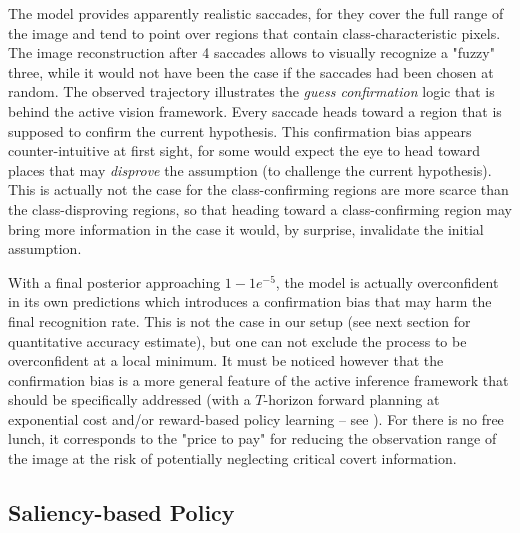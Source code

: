 \documentclass{article} %
\begin{document}
The model provides apparently realistic saccades, for they cover the full range of the image and tend to point over regions that contain class-characteristic pixels. The image reconstruction after 4 saccades allows to visually recognize a "fuzzy" three, while it would not have been the case if the saccades had been chosen at random.
The observed trajectory illustrates the \emph{guess confirmation} logic that is behind the active vision framework. Every saccade heads toward a region that is supposed to confirm the current hypothesis. This confirmation bias appears counter-intuitive at first sight, for some would expect the eye to head toward places that may \emph{disprove} the assumption (to challenge the current hypothesis). This is actually not the case for the class-confirming regions are more scarce than the class-disproving regions, so that heading toward a class-confirming region may bring more information in the case it would, by surprise, invalidate the initial assumption.

With a final posterior approaching $1 - 1e^{-5}$, the model is actually overconfident in its own predictions which introduces a confirmation bias that may harm the final recognition rate. This is not the case in our setup (see next section for quantitative accuracy estimate), but one can not exclude the process to be overconfident at a local minimum. It must be noticed however that the confirmation bias is a more general feature of the active inference framework that should be specifically addressed (with a $T$-horizon forward planning at exponential cost and/or reward-based policy learning -- see \cite{butko2010infomax}). For there is no free lunch, it corresponds to the "price to pay" for reducing the observation range of the image at the risk of potentially neglecting critical covert information. 

\subsection{Saliency-based Policy}
\end{document}
